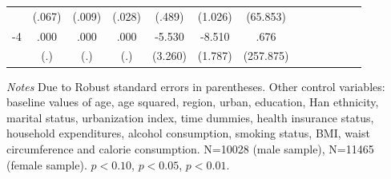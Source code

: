 \begin{table}[p]
\begin{adjustbox}{max width=\linewidth}
\begin{threeparttable}
{\begin{tabular}{l*{6}{SS}}
                &   (.067)         &   (.009)         &   (.028)         &   (.489)         &  (1.026)         & (65.853)         \\
-4             &     .000         &     .000         &     .000         &   -5.530\sym{*}  &   -8.510\sym{***}&     .676         \\
                &      (.)         &      (.)         &      (.)         &  (3.260)         &  (1.787)         &(257.875)         \\    
\bottomrule
\end{tabular}
\begin{tablenotes}
\item \textit{Notes} Due to    Robust standard errors in parentheses.
Other control variables: baseline values of age, age squared, region, urban, education, Han ethnicity, marital status, urbanization index, time dummies, health insurance status, household expenditures, alcohol consumption, smoking status, BMI, waist circumference and calorie consumption. N=10028 (male sample), N=11465 (female sample). \sym{*} \(p<0.10\), \sym{**} \(p<0.05\), \sym{***} \(p<0.01\).
\end{tablenotes}
}
\end{threeparttable}
\end{adjustbox}
\end{table}

\clearpage

